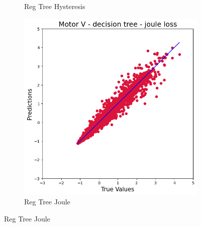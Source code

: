 \documentclass{article}
\begin{document}
\begin{figure}[!htbp]
\begin{subfigure}[b]{0.23\textwidth}
        \caption{Reg Tree Hysteresis}
    \end{subfigure}
    \hfill
    \begin{subfigure}[b]{0.23\textwidth}
        \centering
        \includegraphics[width=\textwidth]{images/V/reg_tree_joule.png}
        \caption{Reg Tree Joule}
    \end{subfigure}
    
    \vspace{0.3cm}
    

\end{figure}
\end{document}
